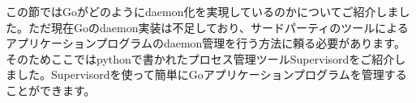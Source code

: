 この節ではGoがどのようにdaemon化を実現しているのかについてご紹介しました。ただ現在Goのdaemon実装は不足しており、サードパーティのツールによるアプリケーションプログラムのdaemon管理を行う方法に頼る必要があります。そのためここではpythonで書かれたプロセス管理ツールSupervisordをご紹介しました。Supervisordを使って簡単にGoアプリケーションプログラムを管理することができます。
